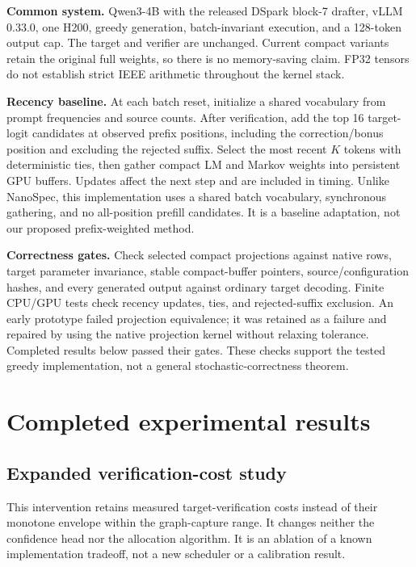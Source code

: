 \documentclass[10pt]{article}
\begin{document}
\textbf{Common system.} Qwen3-4B with the released DSpark block-7 drafter, vLLM 0.33.0, one H200, greedy generation, batch-invariant execution, and a 128-token output cap. The target and verifier are unchanged. Current compact variants retain the original full weights, so there is no memory-saving claim. FP32 tensors do not establish strict IEEE arithmetic throughout the kernel stack.

\textbf{Recency baseline.} At each batch reset, initialize a shared vocabulary from prompt frequencies and source counts. After verification, add the top 16 target-logit candidates at observed prefix positions, including the correction/bonus position and excluding the rejected suffix. Select the most recent $K$ tokens with deterministic ties, then gather compact LM and Markov weights into persistent GPU buffers. Updates affect the next step and are included in timing. Unlike NanoSpec, this implementation uses a shared batch vocabulary, synchronous gathering, and no all-position prefill candidates. It is a baseline adaptation, not our proposed prefix-weighted method.

\textbf{Correctness gates.} Check selected compact projections against native rows, target parameter invariance, stable compact-buffer pointers, source/configuration hashes, and every generated output against ordinary target decoding. Finite CPU/GPU tests check recency updates, ties, and rejected-suffix exclusion. An early prototype failed projection equivalence; it was retained as a failure and repaired by using the native projection kernel without relaxing tolerance. Completed results below passed their gates. These checks support the tested greedy implementation, not a general stochastic-correctness theorem.
\newpage
\section{Completed experimental results}
\subsection{Expanded verification-cost study}
This intervention retains measured target-verification costs instead of their monotone envelope within the graph-capture range. It changes neither the confidence head nor the allocation algorithm. It is an ablation of a known implementation tradeoff, not a new scheduler or a calibration result.
\end{document}
